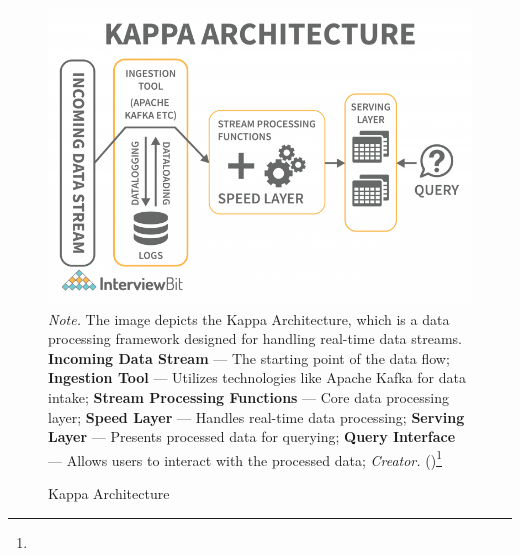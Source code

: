 \begin{figure}[H]
\caption{Kappa Architecture}
\centering
\includegraphics[width=1\linewidth]{images/Kappa-Architecture-768x538.png}
\small
\textit{Note.} The image depicts the Kappa Architecture, which is a data processing framework designed for handling real-time data streams. \textbf{Incoming Data Stream} — The starting point of the data flow; \textbf{Ingestion Tool} — Utilizes technologies like Apache Kafka for data intake; \textbf{Stream Processing Functions} — Core data processing layer; \textbf{Speed Layer} — Handles real-time data processing; \textbf{Serving Layer} — Presents processed data for querying; \textbf{Query Interface} — Allows users to interact with the processed data;
\textit{Creator.} (\cite{interviewBit})\footnote[39]{}
\end{figure}